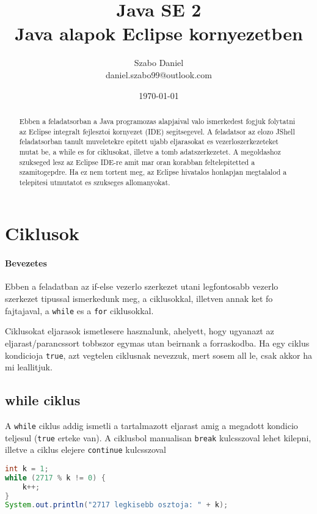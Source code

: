 \documentclass{article}
\title{%
Java SE 2 \\
\large Java alapok Eclipse kornyezetben}
\author{Szabo Daniel\\daniel.szabo99@outlook.com}
\date{\today}
\begin{document}
\maketitle
\begin{abstract}
Ebben a feladatsorban a Java programozas alapjaival valo ismerkedest fogjuk folytatni az Eclipse integralt fejlesztoi kornyezet (IDE) segitsegevel. A feladatsor az elozo JShell feladatsorban tanult muveletekre epitett ujabb eljarasokat es vezerloszerkezeteket mutat be, a while es for ciklusokat, illetve a tomb adatszerkezetet. A megoldashoz szukseged lesz az Eclipse IDE-re amit mar oran korabban feltelepitetted a szamitogepdre. Ha ez nem tortent meg, az Eclipse hivatalos honlapjan megtalalod a telepitesi utmutatot es szukseges allomanyokat.
\end{abstract}

\newpage

\tableofcontents{}

\newpage

\section{Ciklusok}

\paragraph{Bevezetes}

Ebben a feladatban az if-else vezerlo szerkezet utani legfontosabb vezerlo szerkezet tipussal ismerkedunk meg, a ciklusokkal, illetven annak ket fo fajtajaval, a \lstinline{while} es a \lstinline{for} ciklusokkal.

Ciklusokat eljarasok ismetlesere hasznalunk, ahelyett, hogy ugyanazt az eljarast/parancssort tobbszor egymas utan beirnank a forraskodba. Ha egy ciklus kondicioja \lstinline{true}, azt vegtelen ciklusnak nevezzuk, mert sosem all le, csak akkor ha mi leallitjuk.

\subsection{while ciklus}

A \lstinline{while} ciklus addig ismetli a tartalmazott eljarast amig a megadott kondicio teljesul (\lstinline{true} erteke van). A ciklusbol manualisan \lstinline{break} kulcsszoval lehet kilepni, illetve a ciklus elejere \lstinline{continue} kulcsszoval

\begin{lstlisting}[language=Java, caption=Pelda while ciklus 1: 2717 legkisebb osztojanak megkeresese]
int k = 1;
while (2717 % k != 0) {
    k++;
}
System.out.println("2717 legkisebb osztoja: " + k);
\end{lstlisting}
\end{document}
